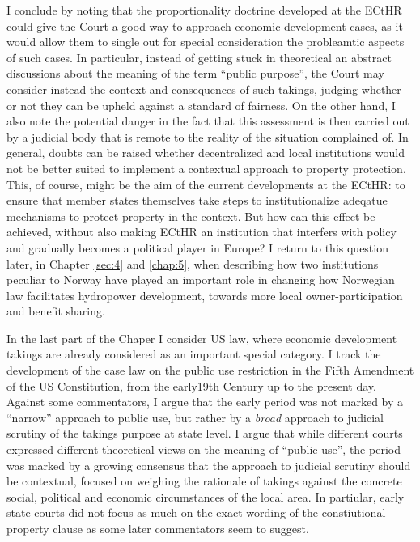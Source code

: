 \documentclass[12pt,a4paper]{article} %
\begin{document}
I conclude by noting that the proportionality doctrine developed at the ECtHR could give the Court a good way to approach economic development cases, as it would allow them to single out for special consideration the probleamtic aspects of such cases. In particular, instead of getting stuck in theoretical an abstract discussions about the meaning of the term ``public purpose'', the Court may consider instead the context and consequences of such takings, judging whether or not they can be upheld against a standard of fairness. On the other hand, I also note the potential danger in the fact that this assessment is then carried out by a judicial body that is remote to the reality of the situation complained of. In general, doubts can be raised whether decentralized and local institutions would not be better suited to implement a contextual approach to property protection. This, of course, might be the aim of the current developments at the ECtHR: to ensure that member states themselves take steps to institutionalize adeqatue mechanisms to protect property in the context. But how can this effect be achieved, without also making ECtHR an institution that interfers with policy and gradually becomes a political player in Europe? I return to this question later, in Chapter \ref{sec:4} and \ref{chap:5}, when describing how two institutions peculiar to Norway have played an important role in changing how Norwegian law 
facilitates hydropower development, towards more local owner-participation and benefit sharing.

In the last part of the Chaper I consider US law, where economic development takings are already considered as an important special category. I track the development of the case law on the public use restriction in the Fifth Amendment of the US Constitution, from the early19th Century up to the present day. Against some commentators, I argue that the early period was not marked by a ``narrow'' approach to public use, but rather by a {\it broad} approach to judicial scrutiny of the takings purpose at state level. I argue that while different courts expressed different theoretical views on the meaning of ``public use'', the period was marked by a growing consensus that the approach to judicial scrutiny should be contextual, focused on weighing the rationale of takings against the concrete social, political and economic circumstances of the local area. In partiular, early state courts did not focus as much on the exact wording of the constiutional property clause as some later commentators seem to suggest.
\end{document}
